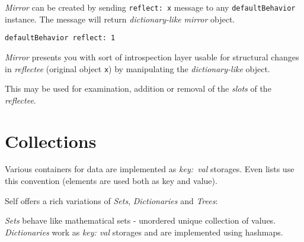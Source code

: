 \documentclass[10pt]{article}
\begin{document}
\begin{multicols*}{3}
\textit{Mirror} can be created by sending \texttt{reflect:\ x} message to any \texttt{defaultBehavior} instance. The message will return \textit{dictionary-like} \textit{mirror} object.

\begin{lstlisting}
defaultBehavior reflect: 1
\end{lstlisting}

\textit{Mirror} presents you with sort of introspection layer usable for structural changes in \textit{reflectee} (original object \texttt{x}) by manipulating the \textit{dictionary-like} object.

This may be used for examination, addition or removal of the \textit{slots} of the \textit{reflectee}.




\vfill
\columnbreak
\section{Collections}
Various containers for data are implemented as \textit{key:\ val} storages. Even lists use this convention (elements are used both as key and value).

Self offers a rich variations of \textit{Sets}, \textit{Dictionaries} and \textit{Trees}:

\vspace*{0.4cm}

\vspace*{0.4cm}
\textit{Sets} behave like mathematical sets - unordered unique collection of values. \textit{Dictionaries} work as \textit{key: val} storages and are implemented using hashmaps.


\end{multicols*}
\end{document}
